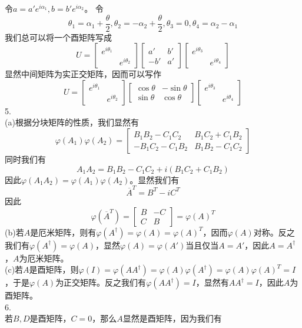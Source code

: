 \documentclass[utf8]{ctexart}
\begin{document}
令$a=a'e^{i\alpha_1},b=b'e^{i\alpha_2}$。
令
\[\theta_1=\alpha_1+\frac{\theta}{2},\theta_2=-\alpha_2+\frac{\theta}{2},\theta_3=0,\theta_4=\alpha_2-\alpha_1\]
我们总可以将一个酉矩阵写成
\[U=\begin{bmatrix}
e^{i\theta_1}&\\
&e^{i\theta_2}
\end{bmatrix}\begin{bmatrix}
a'&b'\\
-b'&a'
\end{bmatrix}\begin{bmatrix}
e^{i\theta_3}&\\
&e^{i\theta_4}
\end{bmatrix}\]
显然中间矩阵为实正交矩阵，因而可以写作
\[U=\begin{bmatrix}
	e^{i\theta_1}&\\
	&e^{i\theta_2}
\end{bmatrix}\begin{bmatrix}
	\cos\theta&-\sin\theta\\
	\sin\theta&\cos\theta
\end{bmatrix}\begin{bmatrix}
	e^{i\theta_3}&\\
	&e^{i\theta_4}
\end{bmatrix}\]
5.\\
(a)根据分块矩阵的性质，我们显然有
\[\varphi(A_1)\varphi(A_2)=\begin{bmatrix}
	B_1B_2-C_1C_2&B_1C_2+C_1B_2\\
	-B_1C_2-C_1B_2&B_1B_2-C_1C_2
\end{bmatrix}\]
同时我们有
\[A_1A_2=B_1B_2-C_1C_2+i(B_1C_2+C_1B_2)\]
因此$\varphi(A_1A_2)=\varphi(A_1)\varphi(A_2)$。显然我们有
\[\overline{A}^T=B^T-iC^T\]
因此
\[\varphi(\overline{A}^T)=\begin{bmatrix}
	B&-C\\
	C&B
\end{bmatrix}=\varphi(A)^T\]
(b)若$A$是厄米矩阵，则有$\varphi(A^\dagger)=\varphi(A)=\varphi(A)^T$，因而$\varphi(A)$对称。反之我们有$\varphi(A^\dagger)=\varphi(A)$，显然$\varphi(A)=\varphi(A')$当且仅当$A=A'$，因此$A=A^\dagger$，$A$为厄米矩阵。\\
(c)若$A$是酉矩阵，则$\varphi(I)=\varphi(AA^\dagger)=\varphi(A)\varphi(A^\dagger)=\varphi(A)\varphi(A)^T=I$，于是$\varphi(A)$为正交矩阵。反之我们有$\varphi(AA^\dagger)=I$，显然有$AA^\dagger=I$，因此$A$为酉矩阵。\\
6.\\
若$B,D$是酉矩阵，$C=0$，那么$A$显然是酉矩阵，因为我们有
\end{document}
